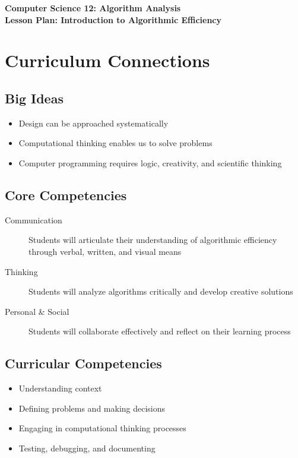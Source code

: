 \documentclass[12pt]{article}
\begin{document}
\begin{center}
{\Large\bfseries Computer Science 12: Algorithm Analysis}\\[2ex]
{\large\bfseries Lesson Plan: Introduction to Algorithmic Efficiency}\\[2ex]
\end{center}

\section*{Curriculum Connections}

\subsection*{Big Ideas}
\begin{itemize}
    \item Design can be approached systematically
    \item Computational thinking enables us to solve problems
    \item Computer programming requires logic, creativity, and scientific thinking
\end{itemize}

\subsection*{Core Competencies}
\begin{description}
    \item[Communication] 
        Students will articulate their understanding of algorithmic efficiency through verbal, written, and visual means
    \item[Thinking]
        Students will analyze algorithms critically and develop creative solutions
    \item[Personal \& Social]
        Students will collaborate effectively and reflect on their learning process
\end{description}

\subsection*{Curricular Competencies}
\begin{itemize}
    \item Understanding context
    \item Defining problems and making decisions
    \item Engaging in computational thinking processes
    \item Testing, debugging, and documenting
\end{itemize}
\end{document}
